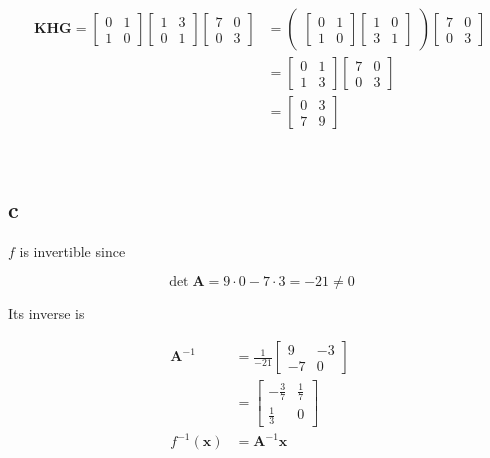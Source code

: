 \documentclass{article}
\newcommand{\blankpage}{
    \newpage
    \
    \newpage
}
\begin{document}
\begin{align*}
    \mathbf {KHG} = 
           \begin{bmatrix} 0 & 1 \\ 1 & 0 \end{bmatrix}
           \begin{bmatrix} 1 & 3 \\ 0 & 1 \end{bmatrix}
           \begin{bmatrix} 7 & 0 \\ 0 & 3 \end{bmatrix}
        &= \begin{pmatrix}
           \begin{bmatrix} 0 & 1 \\ 1 & 0 \end{bmatrix}
           \begin{bmatrix} 1 & 0 \\ 3 & 1 \end{bmatrix}
           \end{pmatrix}
           \begin{bmatrix} 7 & 0 \\ 0 & 3 \end{bmatrix} \\
        &= \begin{bmatrix} 0 & 1 \\ 1 & 3 \end{bmatrix}
           \begin{bmatrix} 7 & 0 \\ 0 & 3 \end{bmatrix} \\
        &= \begin{bmatrix} 0 & 3 \\ 7 & 9 \end{bmatrix}
\end{align*}

\blankpage
\subsection{c}

$f$ is invertible since

$$\det \mathbf A = 9 \cdot 0 - 7 \cdot 3 = -21 \ne 0$$

Its inverse is

\begin{align*}
    \mathbf A^{-1} &= \frac 1{-21} \begin{bmatrix} 9 & -3 \\ -7 & 0 \end{bmatrix} \\
    &= \begin{bmatrix} -\frac37 & \frac17 \\ \frac13 & 0 \end{bmatrix} \\
    f^{-1}(\mathbf x) &= \mathbf A^{-1}\mathbf x
\end{align*}
\end{document}
